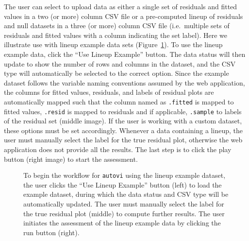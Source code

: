 \documentclass[
doublespace,
  times]{anzsauth}
\begin{document}
The user can select to upload data as either a single set of residuals
and fitted values in a two (or more) column CSV file or a pre-computed
lineup of residuals and null datasets in a three (or more) column CSV
file (i.e.~multiple sets of residuals and fitted values with a column
indicating the set label). Here we illustrate use with lineup example
data sets (Figure~\ref{fig-autovi-web-setup}). To use the lineup example
data, click the ``Use Lineup Example'' button. The data status will then
update to show the number of rows and columns in the dataset, and the
CSV type will automatically be selected to the correct option. Since the
example dataset follows the variable naming conventions assumed by the
web application, the columns for fitted values, residuals, and labels of
residual plots are automatically mapped such that the column named as
\texttt{.fitted} is mapped to fitted values, \texttt{.resid} is mapped
to residuals and if applicable, \texttt{.sample} to labels of the
residual set (middle image). If the user is working with a custom
dataset, these options must be set accordingly. Whenever a data
containing a lineup, the user must manually select the label for the
true residual plot, otherwise the web application does not provide all
the results. The last step is to click the play button (right image) to
start the assessment.

\begin{figure}


\caption{\label{fig-autovi-web-setup}To begin the workflow for
\texttt{autovi} using the lineup example dataset, the user clicks the
``Use Lineup Example'' button (left) to load the example dataset, during
which the data status and CSV type will be automatically updated. The
user must manually select the label for the true residual plot (middle)
to compute further results. The user initiates the assessment of the
lineup example data by clicking the run button (right).}

\end{figure}%
\end{document}
